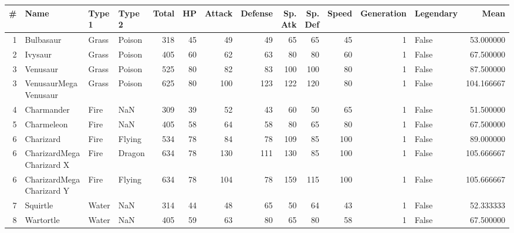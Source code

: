 \begin{tabular}{rlllrrrrrrrrlr}
\toprule
   \# &                       Name &    Type 1 &    Type 2 &  Total &   HP &  Attack &  Defense &  Sp. Atk &  Sp. Def &  Speed &  Generation &  Legendary &        Mean \\
\midrule
   1 &                  Bulbasaur &     Grass &    Poison &    318 &   45 &      49 &       49 &       65 &       65 &     45 &           1 &      False &   53.000000 \\
   2 &                    Ivysaur &     Grass &    Poison &    405 &   60 &      62 &       63 &       80 &       80 &     60 &           1 &      False &   67.500000 \\
   3 &                   Venusaur &     Grass &    Poison &    525 &   80 &      82 &       83 &      100 &      100 &     80 &           1 &      False &   87.500000 \\
   3 &      VenusaurMega Venusaur &     Grass &    Poison &    625 &   80 &     100 &      123 &      122 &      120 &     80 &           1 &      False &  104.166667 \\
   4 &                 Charmander &      Fire &       NaN &    309 &   39 &      52 &       43 &       60 &       50 &     65 &           1 &      False &   51.500000 \\
   5 &                 Charmeleon &      Fire &       NaN &    405 &   58 &      64 &       58 &       80 &       65 &     80 &           1 &      False &   67.500000 \\
   6 &                  Charizard &      Fire &    Flying &    534 &   78 &      84 &       78 &      109 &       85 &    100 &           1 &      False &   89.000000 \\
   6 &  CharizardMega Charizard X &      Fire &    Dragon &    634 &   78 &     130 &      111 &      130 &       85 &    100 &           1 &      False &  105.666667 \\
   6 &  CharizardMega Charizard Y &      Fire &    Flying &    634 &   78 &     104 &       78 &      159 &      115 &    100 &           1 &      False &  105.666667 \\
   7 &                   Squirtle &     Water &       NaN &    314 &   44 &      48 &       65 &       50 &       64 &     43 &           1 &      False &   52.333333 \\
   8 &                  Wartortle &     Water &       NaN &    405 &   59 &      63 &       80 &       65 &       80 &     58 &           1 &      False &   67.500000 \\

\end{tabular}

